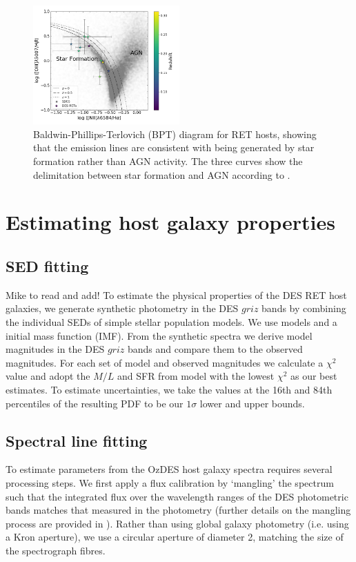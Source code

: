 \documentclass[fleqn,usenatbib,]{mnras}
\newcommand{\mike}[1]{\color{cyan}#1 \color{black}}
\begin{document}
\begin{figure}
\includegraphics[width=0.5\textwidth]{figs/RET_BPT.png}
\caption{Baldwin-Phillips-Terlovich (BPT) diagram for RET hosts, showing that the emission lines are consistent with being generated by star formation rather than AGN activity. The three curves show the delimitation between star formation and AGN according to \citet{Kewley2013}.
\label{fig:bpt}}
\end{figure}

\section{Estimating host galaxy properties \label{sec:measure}}

\subsection{SED fitting \label{subsec:sedfit}}
\mike{Mike to read and add!}
To estimate the physical properties of the DES RET host galaxies, we generate synthetic photometry in the DES $griz$ bands by combining the individual SEDs of simple stellar population models. We use \citet{Bruzual2003} models and a \citet{Chabrier2003} initial mass function (IMF). From the synthetic spectra we derive model magnitudes in the DES $griz$ bands and compare them to the observed magnitudes. For each set of model and observed magnitudes we calculate a $\chi^2$ value and adopt the $M/L$ and SFR from model with the lowest $\chi^2$ as our best estimates. To estimate uncertainties, we take the values at the 16th and 84th percentiles of the resulting PDF to be our $1\sigma$ lower and upper bounds.



\subsection{Spectral line fitting \label{subsec:linefit}}

To estimate parameters from the OzDES host galaxy spectra requires several processing steps. We first apply a flux calibration by `mangling' the spectrum such that the integrated flux over the wavelength ranges of the DES photometric bands matches that measured in the photometry (further details on the mangling process are provided in \citealt{Swann2020}). Rather than using global galaxy photometry (i.e. using a Kron aperture), we use a circular aperture of diameter 2\arcsec, matching the size of the spectrograph fibres.  
\end{document}
